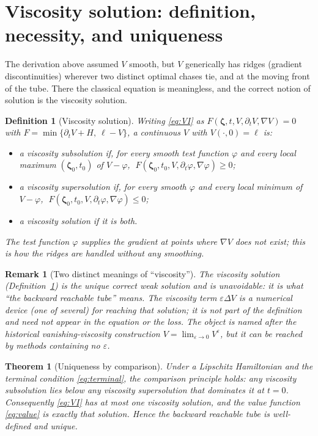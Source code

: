 \documentclass[11pt]{article}
\newtheorem{definition}{Definition}
\newtheorem{theorem}{Theorem}
\newtheorem{remark}{Remark}
\newcommand{\zbf}{\bm{\zeta}}
\begin{document}
\section{Viscosity solution: definition, necessity, and uniqueness}

The derivation above assumed $V$ smooth, but $V$ generically has ridges (gradient discontinuities)
wherever two distinct optimal chases tie, and at the moving front of the tube. There the classical
equation is meaningless, and the correct notion of solution is the viscosity solution.

\begin{definition}[Viscosity solution]\label{def:visc}
Writing \eqref{eq:VI} as $F(\zbf,t,V,\partial_tV,\nabla V)=0$ with
$F=\min\{\partial_tV+H,\ \ell-V\}$, a continuous $V$ with $V(\cdot,0)=\ell$ is:
\begin{itemize}[nosep]
\item a \emph{viscosity subsolution} if, for every smooth test function $\varphi$ and every local
maximum $(\zbf_0,t_0)$ of $V-\varphi$, $\;F(\zbf_0,t_0,V,\partial_t\varphi,\nabla\varphi)\ge0$;
\item a \emph{viscosity supersolution} if, for every smooth $\varphi$ and every local minimum of
$V-\varphi$, $\;F(\zbf_0,t_0,V,\partial_t\varphi,\nabla\varphi)\le0$;
\item a \emph{viscosity solution} if it is both.
\end{itemize}
The test function $\varphi$ supplies the gradient at points where $\nabla V$ does not exist; this
is how the ridges are handled without any smoothing.
\end{definition}

\begin{remark}[Two distinct meanings of ``viscosity'']
The \emph{viscosity solution} (Definition~\ref{def:visc}) is the unique correct weak solution and
is unavoidable: it is what ``the backward reachable tube'' means. The \emph{viscosity term}
$\varepsilon\Delta V$ is a numerical device (one of several) for reaching that solution; it is not
part of the definition and need not appear in the equation or the loss. The object is named after
the historical vanishing-viscosity construction $V=\lim_{\varepsilon\to0}V^\varepsilon$, but it can
be reached by methods containing no $\varepsilon$.
\end{remark}

\begin{theorem}[Uniqueness by comparison]
Under a Lipschitz Hamiltonian and the terminal condition \eqref{eq:terminal}, the comparison
principle holds: any viscosity subsolution lies below any viscosity supersolution that dominates it
at $t=0$. Consequently \eqref{eq:VI} has \emph{at most one} viscosity solution, and the value
function \eqref{eq:value} is exactly that solution. Hence the backward reachable tube is
well-defined and unique.
\end{theorem}
\end{document}
